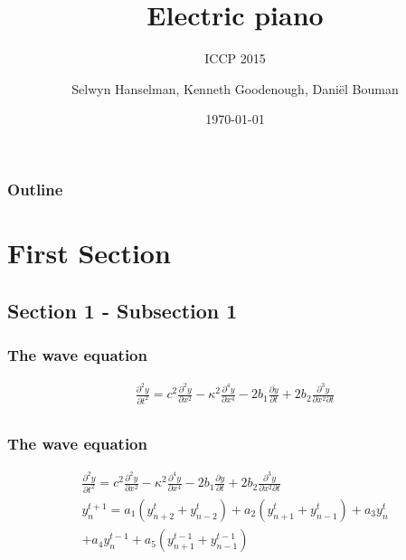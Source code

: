 \documentclass{beamer}
\title[Electric piano]{Electric piano}
\subtitle{\normalsize{ICCP 2015}}
\institute[TU Delft]{Delft University of Technology}
\author{Selwyn Hanselman, Kenneth Goodenough, Dani\"{e}l Bouman}
\date{\today}
\newcommand*\titleTOC{Outline}
\begin{document}
{
%
\frame{\titlepage}
}

{
\begin{frame}\frametitle{\titleTOC}
	\tableofcontents
\end{frame}
}

\section{First Section}
\subsection{Section 1 - Subsection 1}

\begin{frame}\frametitle{The wave equation}
	\begin{gather*}
	\frac{\partial^2 y}{\partial t^2} = c^2\frac{\partial^2 y}{\partial x^2}-\kappa^2\frac{\partial^4y}{\partial x^4}-2b_1\frac{\partial y}{\partial t} + 2b_2 \frac{\partial^3y}{\partial x^2\partial t}\\
\end{gather*}
\end{frame}

\begin{frame}\frametitle{The wave equation}
	\begin{gather*}
	\frac{\partial^2 y}{\partial t^2} = c^2\frac{\partial^2 y}{\partial x^2}-\kappa^2\frac{\partial^4y}{\partial x^4}-2b_1\frac{\partial y}{\partial t} + 2b_2 \frac{\partial^3y}{\partial x^2\partial t}\\
y_n^{t+1} = a_1\left(y_{n+2}^t+y_{n-2}^t\right)+a_2\left(y_{n+1}^t+y_{n-1}^t\right)+a_3y_n^t\\
+a_4y_n^{t-1}+a_5\left(y_{n+1}^{t-1}+y_{n-1}^{t-1}\right)
\end{gather*}
\end{frame}
\end{document}
